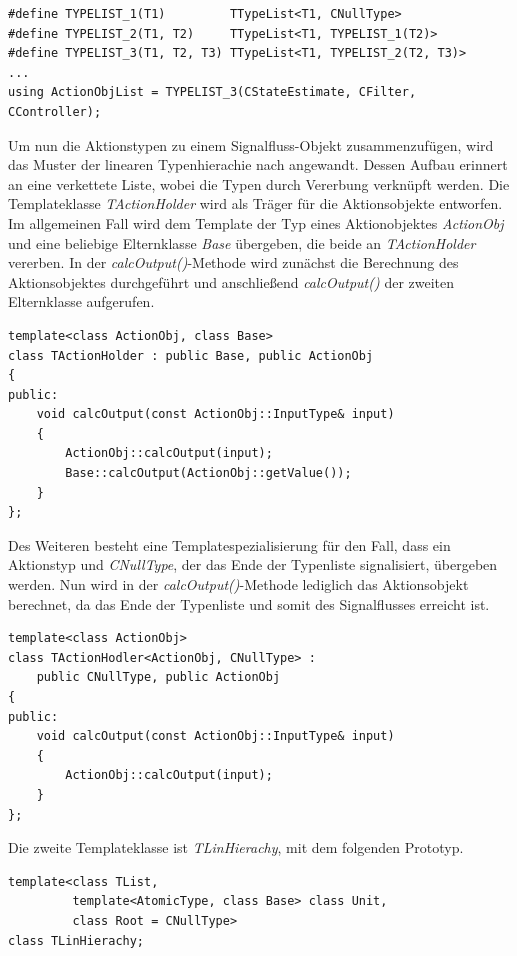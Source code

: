 \begin{lstlisting}[caption={Definition und Aufruf der Makors für verlängerte Typenlisten},captionpos=b]
#define TYPELIST_1(T1)         TTypeList<T1, CNullType>
#define TYPELIST_2(T1, T2) 	   TTypeList<T1, TYPELIST_1(T2)>
#define TYPELIST_3(T1, T2, T3) TTypeList<T1, TYPELIST_2(T2, T3)>
...
using ActionObjList = TYPELIST_3(CStateEstimate, CFilter, CController);
\end{lstlisting}
Um nun die Aktionstypen zu einem Signalfluss-Objekt zusammenzufügen, wird das Muster der linearen Typenhierachie nach \cite[S. 62 ff.]{ModernCpp} angewandt. Dessen Aufbau erinnert an eine verkettete Liste, wobei die Typen durch Vererbung verknüpft werden. Die Templateklasse \textit{TActionHolder} wird als Träger für die Aktionsobjekte entworfen.
Im allgemeinen Fall wird dem Template der Typ eines Aktionobjektes \textit{ActionObj} und eine beliebige Elternklasse \textit{Base} übergeben, die beide an \textit{TActionHolder} vererben. In der \textit{calcOutput()}-Methode wird zunächst die Berechnung des Aktionsobjektes durchgeführt und anschließend \textit{calcOutput()} der zweiten Elternklasse aufgerufen.
\begin{lstlisting}[caption={Templateklasse des Trägerobjektes},captionpos=b]
template<class ActionObj, class Base>
class TActionHolder : public Base, public ActionObj
{
public:
	void calcOutput(const ActionObj::InputType& input)
	{
		ActionObj::calcOutput(input);
		Base::calcOutput(ActionObj::getValue());
	}
};
\end{lstlisting}
Des Weiteren besteht eine Templatespezialisierung für den Fall, dass ein Aktionstyp und \textit{CNullType}, der das Ende der Typenliste signalisiert, übergeben werden. Nun wird in der \textit{calcOutput()}-Methode lediglich das Aktionsobjekt berechnet, da das Ende der Typenliste und somit des Signalflusses erreicht ist.
\begin{lstlisting}[caption={Templatespezialisierung des Trägerobjektes für das Ende der Typenliste},captionpos=b]
template<class ActionObj>
class TActionHodler<ActionObj, CNullType> : 
	public CNullType, public ActionObj
{
public:
	void calcOutput(const ActionObj::InputType& input)
	{
		ActionObj::calcOutput(input);
	}
};
\end{lstlisting}
Die zweite Templateklasse ist \textit{TLinHierachy}, mit dem folgenden Prototyp.
\begin{lstlisting}[caption={Deklaration der Templateklasse für lineare Hierarchien {\cite[S. 63]{ModernCpp}} },captionpos=b]
template<class TList,
         template<AtomicType, class Base> class Unit,
         class Root = CNullType>
class TLinHierachy;
\end{lstlisting} 
